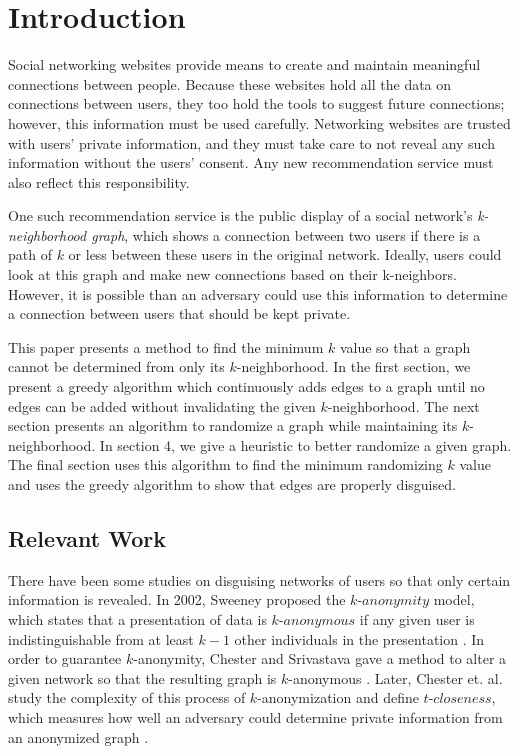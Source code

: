 \section{Introduction}

\indent Social networking websites provide means to create and maintain meaningful connections between people. Because these websites hold all the data on connections between users, they too hold the tools to suggest future connections; however, this information must be used carefully. Networking websites are trusted with users' private information, and they must take care to not reveal any such information without the users' consent. Any new recommendation service must also reflect this responsibility.

\indent One such recommendation service is the public display of a social network's  \emph{k-neighborhood graph}, which shows a connection between two users if there is a path of $k$ or less between these users in the original network. Ideally,  users could look at this graph and make new connections based on their k-neighbors. However, it is possible than an adversary could use this information to determine a connection between users that should be kept private. 

\indent This paper presents a method to find the minimum $k$ value so that a graph cannot be determined from only its $k$-neighborhood. In the first section, we present a greedy algorithm which continuously adds edges to a graph until no edges can be added without invalidating the given $k$-neighborhood. The next section presents an algorithm to randomize a graph while maintaining its $k$-neighborhood. In section $4$, we give a heuristic to better randomize a given graph. The final section uses this algorithm to find the minimum randomizing $k$ value and uses the greedy algorithm to show that edges are properly disguised. 

\subsection {Relevant Work}

\indent There have been some studies on disguising networks of users so that only certain information is revealed. In 2002, Sweeney proposed the $k$-$anonymity$ model, which states that a presentation of data is $k$-$anonymous$ if any given user is indistinguishable from at least $k-1$ other individuals in the presentation \cite{Sweeney02}. In order to guarantee $k$-anonymity, Chester and Srivastava gave a method to alter a given network so that the resulting graph is $k$-anonymous \cite{Chester11}. Later, Chester et. al. study the complexity of this process of $k$-anonymization and define $t$-$closeness$, which measures how well an adversary could determine private information from an anonymized graph \cite{Chester13}.

